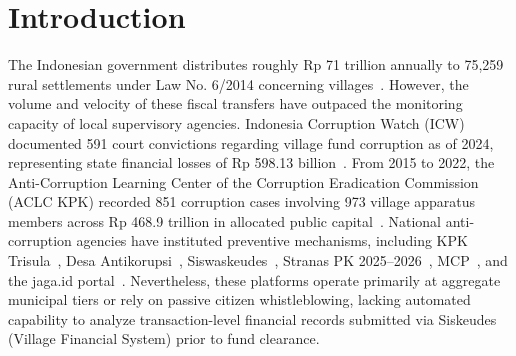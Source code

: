 \documentclass[conference]{IEEEtran}
\begin{document}
\section{Introduction}

The Indonesian government distributes roughly Rp 71 trillion annually to 75,259 rural settlements under Law No. 6/2014 concerning villages~\cite{ref1}. However, the volume and velocity of these fiscal transfers have outpaced the monitoring capacity of local supervisory agencies. Indonesia Corruption Watch (ICW) documented 591 court convictions regarding village fund corruption as of 2024, representing state financial losses of Rp 598.13 billion~\cite{ref2}. From 2015 to 2022, the Anti-Corruption Learning Center of the Corruption Eradication Commission (ACLC KPK) recorded 851 corruption cases involving 973 village apparatus members across Rp 468.9 trillion in allocated public capital~\cite{ref3}. National anti-corruption agencies have instituted preventive mechanisms, including KPK Trisula~\cite{ref36}, Desa Antikorupsi~\cite{ref37}, Siswaskeudes~\cite{ref38}, Stranas PK 2025--2026~\cite{ref39}, MCP~\cite{ref40}, and the jaga.id portal~\cite{ref26}. Nevertheless, these platforms operate primarily at aggregate municipal tiers or rely on passive citizen whistleblowing, lacking automated capability to analyze transaction-level financial records submitted via Siskeudes (Village Financial System) prior to fund clearance.
\end{document}
